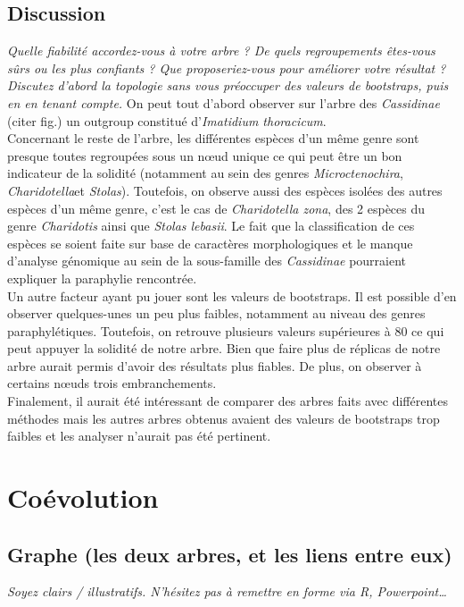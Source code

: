 \documentclass[a4paper, 11pt]{article}
\begin{document}
\subsection{Discussion}
\emph{Quelle fiabilité accordez-vous à votre arbre ? De quels regroupements êtes-vous sûrs ou les plus confiants ? Que proposeriez-vous pour améliorer votre résultat ?}
\emph{
Discutez d’abord la topologie sans vous préoccuper des valeurs de bootstraps, puis en en tenant compte.}
On peut tout d’abord observer sur l’arbre des \emph{Cassidinae} (citer fig.) un outgroup constitué d’\emph{Imatidium thoracicum}.\\
Concernant le reste de l’arbre, les différentes espèces d’un même genre sont presque toutes regroupées sous un nœud unique ce qui peut être un bon indicateur de la solidité (notamment au sein des genres \emph{Microctenochira}, \emph{Charidotella}et \emph{Stolas}). Toutefois, on observe aussi des espèces isolées des autres espèces d’un même genre, c’est le cas de \emph{Charidotella zona}, des 2 espèces du genre \emph{Charidotis} ainsi que \emph{Stolas lebasii}. Le fait que la classification de ces espèces se soient faite sur base de caractères morphologiques et le manque d’analyse génomique au sein de la sous-famille des \emph{Cassidinae} pourraient expliquer la paraphylie rencontrée.\\
Un autre facteur ayant pu jouer sont les valeurs de bootstraps. Il est possible d’en observer quelques-unes un peu plus faibles, notamment au niveau des genres paraphylétiques. Toutefois, on retrouve plusieurs valeurs supérieures à 80 ce qui peut appuyer la solidité de notre arbre. Bien que faire plus de réplicas de notre arbre aurait permis d’avoir des résultats plus fiables. De plus, on observer à certains nœuds trois embranchements.\\ 
Finalement, il aurait été intéressant de comparer des arbres faits avec différentes méthodes mais les autres arbres obtenus avaient des valeurs de bootstraps trop faibles et les analyser n’aurait pas été pertinent.


\section{Coévolution}

\subsection{Graphe (les deux arbres, et les liens entre eux)}
\emph{Soyez clairs / illustratifs. N’hésitez pas à remettre en forme via R, Powerpoint…}
\end{document}
